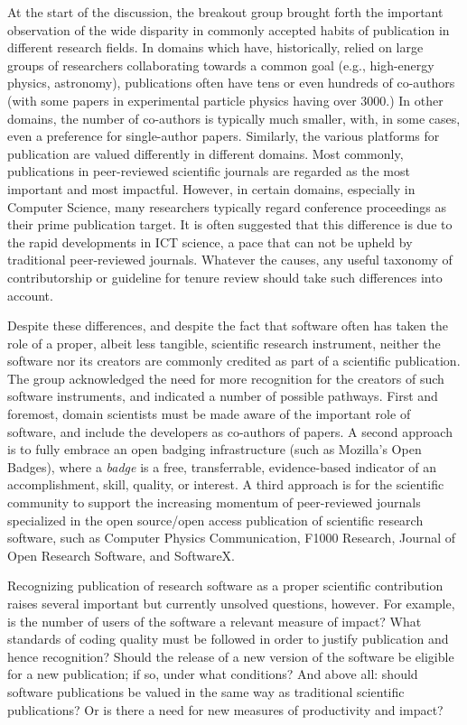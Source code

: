 \documentclass[11pt, oneside]{amsart}
\begin{document}
At the start of the discussion, the breakout group brought forth the important
observation of the wide disparity in commonly accepted habits of publication in
different research fields. In domains which have, historically, relied on large
groups of researchers collaborating towards a common goal (e.g., high-energy
physics, astronomy), publications often have tens or even hundreds of co-authors
(with some papers in experimental particle physics having over 3000.) In other
domains, the number of co-authors is typically much smaller, with, in some
cases, even a preference for single-author papers. Similarly, the various
platforms for publication are valued differently in different domains. Most
commonly, publications in peer-reviewed scientific journals are regarded as the
most important and most impactful. However, in certain domains, especially in
Computer Science, many researchers typically regard conference proceedings as
their prime publication target. It is often suggested that this difference is
due to the rapid developments in ICT science, a pace that can not be upheld by
traditional peer-reviewed journals. Whatever the causes, any useful taxonomy of
contributorship or guideline for tenure review should take such differences into
account.

Despite these differences, and despite the fact that software often has taken
the role of a proper, albeit less tangible, scientific research instrument,
neither the software nor its creators are commonly credited as part of a
scientific publication. The group acknowledged the need for more recognition for
the creators of such software instruments, and indicated a number of possible
pathways. First and foremost, domain scientists must be made aware of the
important role of software, and include the developers as co-authors of papers.
A second approach is to fully embrace an open badging infrastructure (such as
Mozilla's Open Badges), where a {\em badge\/} is a free, transferrable,
evidence-based indicator of an accomplishment, skill, quality, or interest. A
third approach is for the scientific community to support the increasing
momentum of peer-reviewed journals specialized in the open source/open access
publication of scientific research software, such as Computer Physics
Communication, F1000 Research, Journal of Open Research Software, and SoftwareX.

Recognizing publication of research software as a proper scientific contribution
raises several important but currently unsolved questions, however. For example,
is the number of users of the software a relevant measure of impact? What
standards of coding quality must be followed in order to justify publication and
hence recognition? Should the release of a new version of the software be
eligible for a new publication; if so, under what conditions? And above all:
should software publications be valued in the same way as traditional scientific
publications? Or is there a need for new measures of productivity and impact?
\end{document}
